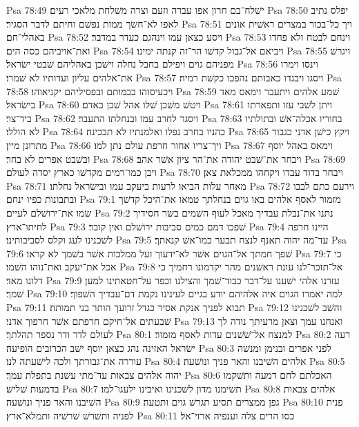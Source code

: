 Psa 78:49  ישׁלח־בם חרון אפו עברה וזעם וצרה משׁלחת מלאכי רעים׃
Psa 78:50  יפלס נתיב לאפו לא־חשׂך ממות נפשׁם וחיתם לדבר הסגיר׃
Psa 78:51  ויך כל־בכור במצרים ראשׁית אונים באהלי־חם׃
Psa 78:52  ויסע כצאן עמו וינהגם כעדר במדבר׃
Psa 78:53  וינחם לבטח ולא פחדו ואת־אויביהם כסה הים׃
Psa 78:54  ויביאם אל־גבול קדשׁו הר־זה קנתה ימינו׃
Psa 78:55  ויגרשׁ מפניהם גוים ויפילם בחבל נחלה וישׁכן באהליהם שׁבטי ישׂראל׃
Psa 78:56  וינסו וימרו את־אלהים עליון ועדותיו לא שׁמרו׃
Psa 78:57  ויסגו ויבגדו כאבותם נהפכו כקשׁת רמיה׃
Psa 78:58  ויכעיסוהו בבמותם ובפסיליהם יקניאוהו׃
Psa 78:59  שׁמע אלהים ויתעבר וימאס מאד בישׂראל׃
Psa 78:60  ויטשׁ משׁכן שׁלו אהל שׁכן באדם׃
Psa 78:61  ויתן לשׁבי עזו ותפארתו ביד־צר׃
Psa 78:62  ויסגר לחרב עמו ובנחלתו התעבר׃
Psa 78:63  בחוריו אכלה־אשׁ ובתולתיו לא הוללו׃
Psa 78:64  כהניו בחרב נפלו ואלמנתיו לא תבכינה׃
Psa 78:65  ויקץ כישׁן אדני כגבור מתרונן מיין׃
Psa 78:66  ויך־צריו אחור חרפת עולם נתן למו׃
Psa 78:67  וימאס באהל יוסף ובשׁבט אפרים לא בחר׃
Psa 78:68  ויבחר את־שׁבט יהודה את־הר ציון אשׁר אהב׃
Psa 78:69  ויבן כמו־רמים מקדשׁו כארץ יסדה לעולם׃
Psa 78:70  ויבחר בדוד עבדו ויקחהו ממכלאת צאן׃
Psa 78:71  מאחר עלות הביאו לרעות ביעקב עמו ובישׂראל נחלתו׃
Psa 78:72  וירעם כתם לבבו ובתבונות כפיו ינחם׃
Psa 79:1  מזמור לאסף אלהים באו גוים בנחלתך טמאו את־היכל קדשׁך שׂמו את־ירושׁלם לעיים׃
Psa 79:2  נתנו את־נבלת עבדיך מאכל לעוף השׁמים בשׂר חסידיך לחיתו־ארץ׃
Psa 79:3  שׁפכו דמם כמים סביבות ירושׁלם ואין קובר׃
Psa 79:4  היינו חרפה לשׁכנינו לעג וקלס לסביבותינו׃
Psa 79:5  עד־מה יהוה תאנף לנצח תבער כמו־אשׁ קנאתך׃
Psa 79:6  שׁפך חמתך אל־הגוים אשׁר לא־ידעוך ועל ממלכות אשׁר בשׁמך לא קראו׃
Psa 79:7  כי אכל את־יעקב ואת־נוהו השׁמו׃
Psa 79:8  אל־תזכר־לנו עונת ראשׁנים מהר יקדמונו רחמיך כי דלונו מאד׃
Psa 79:9  עזרנו אלהי ישׁענו על־דבר כבוד־שׁמך והצילנו וכפר על־חטאתינו למען שׁמך׃
Psa 79:10  למה יאמרו הגוים איה אלהיהם יודע בגיים לעינינו נקמת דם־עבדיך השׁפוך׃
Psa 79:11  תבוא לפניך אנקת אסיר כגדל זרועך הותר בני תמותה׃
Psa 79:12  והשׁב לשׁכנינו שׁבעתים אל־חיקם חרפתם אשׁר חרפוך אדני׃
Psa 79:13  ואנחנו עמך וצאן מרעיתך נודה לך לעולם לדר ודר נספר תהלתך׃
Psa 80:1  למנצח אל־שׁשׁנים עדות לאסף מזמור׃
Psa 80:2  רעה ישׂראל האזינה נהג כצאן יוסף ישׁב הכרובים הופיעה׃
Psa 80:3  לפני אפרים ובנימן ומנשׁה עוררה את־גבורתך ולכה לישׁעתה לנו׃
Psa 80:4  אלהים השׁיבנו והאר פניך ונושׁעה׃
Psa 80:5  יהוה אלהים צבאות עד־מתי עשׁנת בתפלת עמך׃
Psa 80:6  האכלתם לחם דמעה ותשׁקמו בדמעות שׁלישׁ׃
Psa 80:7  תשׂימנו מדון לשׁכנינו ואיבינו ילעגו־למו׃
Psa 80:8  אלהים צבאות השׁיבנו והאר פניך ונושׁעה׃
Psa 80:9  גפן ממצרים תסיע תגרשׁ גוים ותטעה׃
Psa 80:10  פנית לפניה ותשׁרשׁ שׁרשׁיה ותמלא־ארץ׃
Psa 80:11  כסו הרים צלה וענפיה ארזי־אל׃
